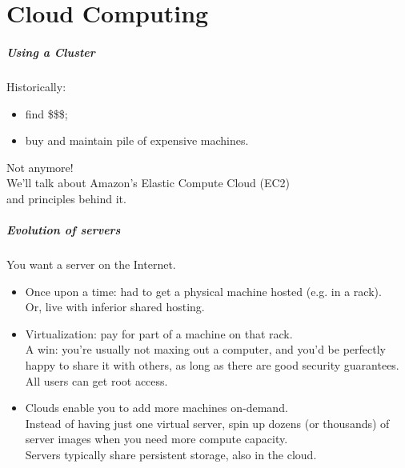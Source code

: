 \part{Cloud Computing}
\frame{\partpage}

\begin{frame}
  \frametitle{Using a Cluster}

  
    Historically:
\begin{itemize}
  \item find \$\$\$;
  \item buy and maintain pile of expensive machines.
\end{itemize}

  Not anymore! \\[1em]

  We'll talk about Amazon's Elastic Compute Cloud (EC2)\\ and
  principles behind it.
  
\end{frame}

\begin{frame}
  \frametitle{Evolution of servers}

  

You want a server on the Internet.
\begin{itemize}
\item 
  Once upon a time: had to get a physical machine hosted (e.g. in a rack).\\
  Or, live with inferior shared hosting.\\[1em]
\item Virtualization: pay for part of a
  machine on that rack.  \\
  A win: you're usually not maxing out a computer, and you'd
  be perfectly happy to share it with others, as long as there are
  good security guarantees. All users can get root access.\\[1em]
\item Clouds enable you to add more machines on-demand. \\ Instead of
  having just one virtual server, spin up dozens (or
  thousands) of server images when you need more compute
  capacity. \\

  Servers typically share persistent storage, also in
  the cloud. 
\end{itemize}
  
\end{frame}

